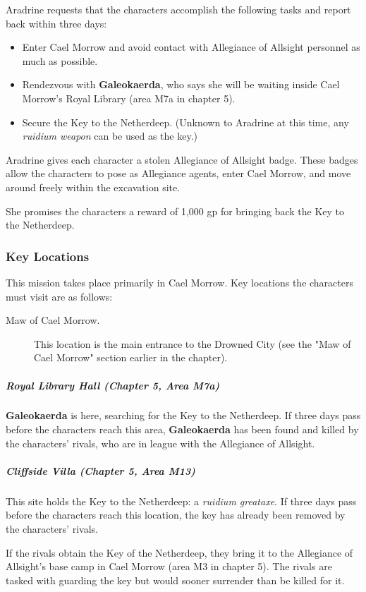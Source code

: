 \documentclass[10pt,a4paper,twoside,bg=print,twocolumn,openany,nodeprecatedcode]{dndbook}
\begin{document}
Aradrine requests that the characters accomplish the following tasks and report back within three days:


\begin{itemize}
\item Enter Cael Morrow and avoid contact with Allegiance of Allsight personnel as much as possible.
\item Rendezvous with \textbf{Galeokaerda}, who says she will be waiting inside Cael Morrow's Royal Library (area M7a in chapter 5).
\item Secure the Key to the Netherdeep. (Unknown to Aradrine at this time, any \textit{ruidium weapon} can be used as the key.)
\end{itemize}

Aradrine gives each character a stolen Allegiance of Allsight badge. These badges allow the characters to pose as Allegiance agents, enter Cael Morrow, and move around freely within the excavation site.

She promises the characters a reward of 1,000 gp for bringing back the Key to the Netherdeep.

\subsubsection{Key Locations}
This mission takes place primarily in Cael Morrow. Key locations the characters must visit are as follows:


\begin{description}
\item[Maw of Cael Morrow.]
This location is the main entrance to the Drowned City (see the "Maw of Cael Morrow" section earlier in the chapter).
\end{description}

\subparagraph{Royal Library Hall (Chapter 5, Area M7a)}
\textbf{Galeokaerda} is here, searching for the Key to the Netherdeep. If three days pass before the characters reach this area, \textbf{Galeokaerda} has been found and killed by the characters' rivals, who are in league with the Allegiance of Allsight.

\subparagraph{Cliffside Villa (Chapter 5, Area M13)}
This site holds the Key to the Netherdeep: a \textit{ruidium greataxe}. If three days pass before the characters reach this location, the key has already been removed by the characters' rivals.

If the rivals obtain the Key of the Netherdeep, they bring it to the Allegiance of Allsight's base camp in Cael Morrow (area M3 in chapter 5). The rivals are tasked with guarding the key but would sooner surrender than be killed for it.
\end{document}
